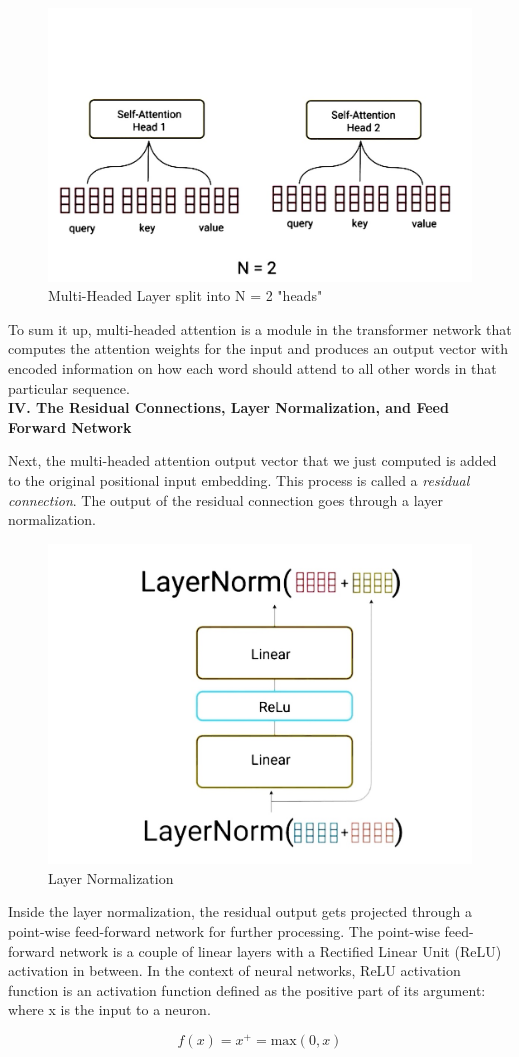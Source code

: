 \begin{figure}[H]
\centering
\includegraphics[width=.4\textwidth]{figures/t9.jpg}
\caption{Multi-Headed Layer split into N = 2 "heads"}
\end{figure}

To sum it up, multi-headed attention is a module in the transformer network that computes the attention weights for the input and produces an output vector with encoded information on how each word should attend to all other words in that particular sequence. \\

\noindent
\textbf{IV. The Residual Connections, Layer Normalization, and Feed Forward Network}

Next, the multi-headed attention output vector that we just computed is added to the original positional input embedding. This process is called a \emph{residual connection}. The output of the residual connection goes through a layer normalization. 

\begin{figure}[H]
\centering
\includegraphics[width=.4\textwidth]{figures/t10.jpg}
\caption{Layer Normalization}
\end{figure}

Inside the layer normalization, the residual output gets projected through a point-wise feed-forward network for further processing. The point-wise feed-forward network is a couple of linear layers with a Rectified Linear Unit (ReLU) activation in between. In the context of neural networks, ReLU activation function\cite{eleven} is an activation function defined as the positive part of its argument: where x is the input to a neuron.

\begin{equation}
\label{softmax}
f(x) = x^{+} = \text{max}(0,x)
\end{equation}


